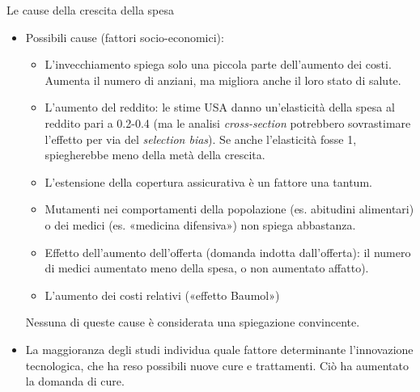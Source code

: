 \documentclass[aspectratio=149,11pt]{beamer}
\begin{document}
\begin{frame}{Le cause della crescita della spesa}
\begin{itemize}
\item Possibili cause (fattori socio-economici):
\begin{itemize}
\item L'\alert{invecchiamento} spiega solo una piccola parte dell'aumento dei
costi. Aumenta il numero di anziani, ma migliora anche il loro stato di
salute.
\item L'\alert{aumento del reddito}: le stime USA danno un'elasticità della spesa al
reddito pari a 0.2-0.4 (ma le analisi \emph{cross-section} potrebbero
sovrastimare l'effetto per via del \emph{selection bias}). Se anche
l'elasticità fosse 1, spiegherebbe meno della metà della crescita.
\item L'\alert{estensione della copertura assicurativa} è un fattore una tantum.
\item Mutamenti nei comportamenti della popolazione (es. abitudini alimentari) o
dei medici (es. «medicina difensiva») non spiega abbastanza.
\item Effetto dell'aumento dell'offerta (domanda indotta dall'offerta): il
numero di medici aumentato meno della spesa, o non aumentato affatto).
\item L'aumento dei costi relativi («effetto Baumol»)
\end{itemize}
Nessuna di queste cause è considerata una spiegazione convincente.
\item La maggioranza degli studi individua quale fattore determinante
l'\alert{innovazione tecnologica}, che ha reso possibili nuove cure e
trattamenti. Ciò ha aumentato la domanda di cure.
\end{itemize}
\end{frame}
\end{document}
